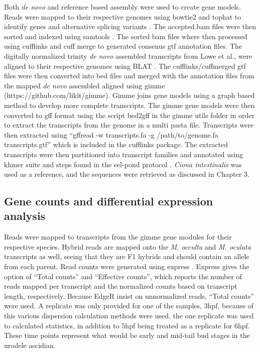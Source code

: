 Both \textit{de novo} and reference based assembly were used to create gene models. Reads were mapped to their respective genomes using bowtie2 and tophat to identify genes and alternative splicing variants \cite{langmead_fast_2012,trapnell_differential_2012}. The accepted.bam files were then sorted and indexed using samtools \cite{li_sequence_2009}. The sorted bam files where then processed using cufflinks and cuff merge to generated consenus gtf annotation files. The digitally normalized trinity \textit{de novo} assembled transcripts from Lowe et al., were aligned to their respective genomes using BLAT \cite{haas_novo_2013}. The cufflinks/cuffmerged gtf files were then converted into bed files and merged with the annotation files from the mapped \textit{de novo} assembled aligned using gimme (https://github.com/likit/gimme). Gimme joins gene models using a graph based method to develop more complete transcripts. The gimme gene models were then converted to gff format using the script bed2gff in the gimme utils folder in order to extract the transcripts from the genome in a multi pasta file. Transcripts were then extracted using ``gffread -w transcripts.fa -g /path/to/genome.fa transcripts.gtf'' which is included in the cufflinks package. The extracted transcripts were then partitioned into transcript families and annotated using khmer suite and steps found in the eel-pond protocol \cite{}. \textit{Ciona intestinalis} was used as a reference, and the sequences were retrieved as discussed in Chapter 3. 

\subsection{Gene counts and differential expression analysis}
Reads were mapped to transcripts from the gimme gene modules for their respective species. Hybrid reads are mapped onto the \textit{M. occulta} and \textit{M. oculata} transcripts as well, seeing that they are F1 hybrids and should contain an allele from each parent. Read counts were generated using express \cite{}. Express gives the option of ``Total counts'' and ``Effective counts'', which reports the number of reads mapped per transcript and the normalized counts based on transcript length, respectively. Because EdgeR insist on unnormalized reads, ``Total counts'' were used. A replicate was only provided for one of the samples, 3hpf, because of this various dispersion calculation methods were used. the one replicate was used to calculated statistics, in addition to 5hpf being treated as a replicate for 6hpf. These time points represent what would be early and mid-tail bud stages in the urodele ascidian. 

